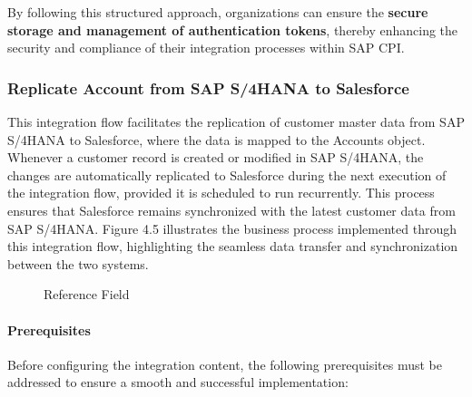 By following this structured approach, organizations can ensure the \textbf{secure storage and management of authentication tokens}, thereby enhancing the security and compliance of their integration processes within SAP CPI.



\subsubsection{Replicate Account from SAP S/4HANA to Salesforce}

This integration flow facilitates the replication of customer master data from SAP S/4HANA to Salesforce, where the data is mapped to the Accounts object. Whenever a customer record is created or modified in SAP S/4HANA, the changes are automatically replicated to Salesforce during the next execution of the integration flow, provided it is scheduled to run recurrently. This process ensures that Salesforce remains synchronized with the latest customer data from SAP S/4HANA. Figure 4.5 illustrates the business process implemented through this integration flow, highlighting the seamless data transfer and synchronization between the two systems.

    \begin{figure}[H]
    \centering
    \caption{Reference Field}
    
    \end{figure}


\paragraph{Prerequisites}
Before configuring the integration content, the following prerequisites must be addressed to ensure a smooth and successful implementation:

